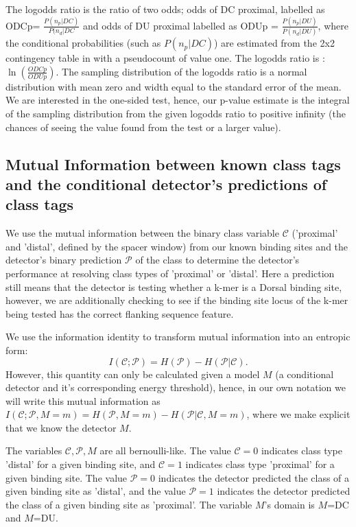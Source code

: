 \par
  The logodds ratio is the ratio of two odds; odds of DC proximal, labelled as ODCp= $\frac{P(n_p|DC)}{P(n_d|DC}$ and odds of DU proximal labelled as ODUp = $\frac{P(n_p|DU)}{P(n_d|DU)}$, where the conditional probabilities (such as $P(n_p|DC)$) are estimated from the 2x2 contingency table in  with a pseudocount of value one.  The logodds ratio is : $\ln(\frac{ODCp}{ODUp})$.  The sampling distribution of the logodds ratio is a normal distribution with mean zero and width equal to the standard error of the mean.  We are interested in the one-sided test, hence, our p-value estimate is the integral of the sampling distribution from the given logodds ratio to positive infinity (the chances of seeing the value found from the test or a larger value).
  
 
 \subsection{ Mutual Information between known class tags and the conditional detector's predictions of class tags}\label{misup}
 
We use the mutual information between the binary class variable $\mathcal C$ ('proximal' and 'distal', defined by the spacer window) from our known binding sites and the detector's binary prediction $\mathcal P$ of the class to determine the detector's performance at resolving class types of 'proximal' or 'distal'.  Here a prediction still means that the detector is testing whether a k-mer is a Dorsal binding site, however, we are additionally checking to see if the binding site locus of the k-mer being tested has the correct flanking sequence feature.

  We use the information identity to transform mutual information into an entropic form:
\begin{equation}  
   I(\mathcal C;\mathcal P)=H(\mathcal P)-H(\mathcal P|\mathcal C).
\end{equation}   
     However, this quantity can only be calculated given a model $M$ (a conditional detector and it's corresponding energy threshold), hence, in our own notation we will write this mutual information as $I(\mathcal C;\mathcal P,M=m)=H(\mathcal P,M=m)-H(\mathcal P|\mathcal C,M=m)$, where we make explicit that we know the detector $M$.
     
The variables $\mathcal C, \mathcal P, M$ are all bernoulli-like.   The value $\mathcal C=0$ indicates class type 'distal' for a given binding site, and $\mathcal C=1$ indicates class type 'proximal' for a given binding site.  The value $\mathcal P=0$ indicates the detector predicted the class of a given binding site as 'distal', and the value $\mathcal P=1$ indicates the detector predicted the class of a given binding site as 'proximal'.  The variable $M$'s domain is $M$=DC and $M$=DU.  
     
